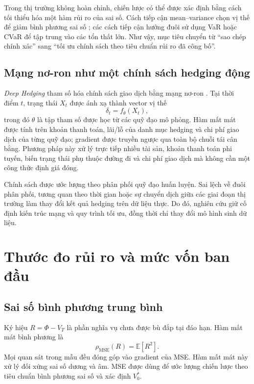 Trong thị trường không hoàn chỉnh, chiến lược có thể được xác định bằng cách
tối thiểu hóa một hàm rủi ro của sai số. Cách tiếp cận mean--variance chọn vị
thế để giảm bình phương sai số \parencite{FollmerSondermann1986,Schweizer2010};
các cách tiếp cận hướng đuôi sử dụng VaR hoặc CVaR để tập trung vào các tổn thất
lớn. Như vậy, mục tiêu chuyển từ ``sao chép chính xác'' sang ``tối ưu chính
sách theo tiêu chuẩn rủi ro đã công bố''.

\subsection{Mạng nơ-ron như một chính sách hedging động}

\textit{Deep Hedging} tham số hóa chính sách giao dịch bằng mạng nơ-ron
\parencite{Buehler2019}. Tại thời điểm $t$, trạng thái $X_t$ được ánh xạ thành
vector vị thế
\begin{equation}
    \delta_t=f_{\theta}(X_t),
    \label{eq:c2-neural-policy}
\end{equation}
trong đó $\theta$ là tập tham số được học từ các quỹ đạo mô phỏng. Hàm mất mát
được tính trên khoản thanh toán, lãi/lỗ của danh mục hedging và chi phí giao dịch của từng quỹ đạo;
gradient được truyền ngược qua toàn bộ chuỗi tái cân bằng. Phương pháp này xử
lý trực tiếp nhiều tài sản, khoản thanh toán phi tuyến, biến trạng thái phụ thuộc đường
đi và chi phí giao dịch mà không cần một công thức định giá đóng.

Chính sách được ước lượng theo phân phối quỹ đạo huấn luyện. Sai lệch về đuôi
phân phối, tương quan theo thời gian hoặc sự chuyển dịch giữa các giai đoạn thị
trường làm thay đổi kết quả hedging trên dữ liệu thực. Do đó, nghiên cứu giữ
cố định kiến trúc mạng và quy trình tối ưu, đồng thời chỉ thay đổi mô hình sinh
dữ liệu.

\section{Thước đo rủi ro và mức vốn ban đầu}
\label{sec:c2-risk-measures}

\subsection{Sai số bình phương trung bình}

Ký hiệu $R=\Phi-V_T$ là phần nghĩa vụ chưa được bù đắp tại đáo hạn. Hàm mất
mát bình phương là
\begin{equation}
    \rho_{\mathrm{MSE}}(R)=\mathbb{E}[R^2].
    \label{eq:c2-mse}
\end{equation}
Mọi quan sát trong mẫu đều đóng góp vào gradient của MSE. Hàm mất mát này xử
lý đối xứng sai số dương và âm. MSE được dùng để ước lượng chiến lược theo tiêu
chuẩn bình phương sai số và xác định $V_0^{*}$.

